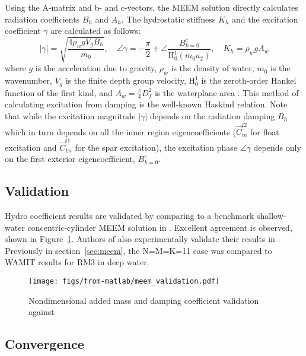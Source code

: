 \begin{appendices}
Using the A-matrix and b- and c-vectors, the MEEM solution directly calculates radiation coefficients $B_h$ and $A_h$.
The hydrostatic stiffness $K_h$ and the excitation coefficient $\gamma$ are calculated as follows:
\begin{equation}\label{eq:gamma-K}
    |\gamma|  = \sqrt{\frac{ 4 \rho_w g V_g  B_h} {m_0}}, \quad %
   \angle \gamma = -\frac{\pi}{2} + \angle\frac{ B_{k=0}^e}{\textrm{H}_0^{1}(m_0 a_2)},\quad
    K_h       = \rho_w g A_w  %
\end{equation}
where $g$ is the acceleration due to gravity, $\rho_w$ is the density of water, $m_0$ is the wavenumber, $V_g$ is the finite depth group velocity, $\textrm{H}_0^1$ is the zeroth-order Hankel function of the first kind, and $A_w= \frac{\pi}{4} D_f^2$ is the waterplane area \cite{newman}.
This method of calculating excitation from damping is the well-known Haskind relation.
Note that while the excitation magnitude $|\gamma|$ depends on the radiation damping $B_h$ which in turn depends on all the inner region eigencoefficients ($\vec{C}_{m}^{i2}$ for float excitation and $\vec{C}_{1n}^{i1}$ for the spar excitation), the excitation phase $\angle\gamma$ depends only on the first exterior eigencoefficient, $B_{k=0}^e$. 

\subsection{Validation}

Hydro coefficient results are validated by comparing to a benchmark shallow-water concentric-cylinder MEEM solution in \cite{chau_inertia_2012}.
Excellent agreement is observed, shown in Figure~\ref{fig:meem-yeung-validation}.
Authors of \cite{chau_inertia_2012} also experimentally validate their results in \cite{son_performance_2016}.
Previously in section~\ref{sec:meem}, the N=M=K=11 case was compared to WAMIT results for RM3 in deep water.

\begin{figure}
    \centering
    \texttt{[image: figs/from-matlab/meem\_validation.pdf]}
    \caption{Nondimensional added mass and damping coefficient validation against \cite{chau_inertia_2012}}
    \label{fig:meem-yeung-validation}
\end{figure}

\subsection{Convergence}


\end{appendices}
